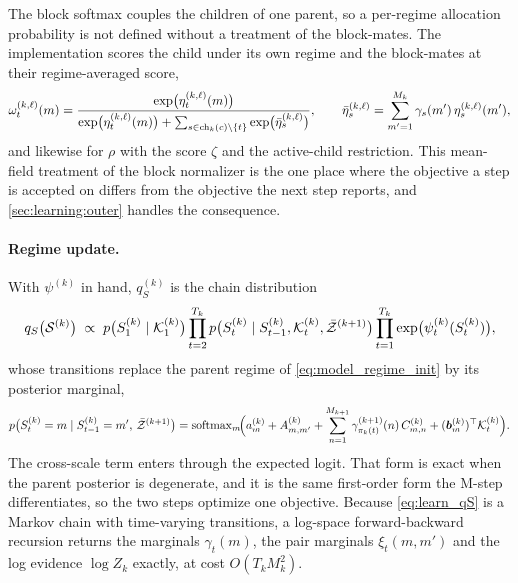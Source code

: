 The block softmax couples the children of one parent, so a per-regime allocation probability is
not defined without a treatment of the block-mates. The implementation scores the child under its
own regime and the block-mates at their regime-averaged score,
\begin{align}
\omega_t^{(k,\ell)}(m)
=
\frac{\exp\!\big(\eta_t^{(k,\ell)}(m)\big)}
{\exp\!\big(\eta_t^{(k,\ell)}(m)\big) + \sum_{s \in \operatorname{ch}_k(c) \setminus \{t\}} \exp\!\big(\bar{\eta}_s^{(k,\ell)}\big)},
\qquad
\bar{\eta}_s^{(k,\ell)} = \sum_{m'=1}^{M_k} \gamma_s(m')\, \eta_s^{(k,\ell)}(m'),
\label{eq:learn_loo_omega}
\end{align}
and likewise for $\rho$ with the score $\zeta$ and the active-child restriction. This mean-field
treatment of the block normalizer is the one place where the objective a step is accepted on
differs from the objective the next step reports, and \cref{sec:learning:outer} handles the
consequence.

\paragraph{Regime update.}
With $\psi^{(k)}$ in hand, $q_S^{(k)}$ is the chain distribution
\begin{align}
q_S\big({\mathcal{S}}^{(k)}\big)
\;\propto\;
p\big(S_1^{(k)} \mid {\mathcal{K}}_1^{(k)}\big)
\prod_{t=2}^{T_k}
p\big(S_t^{(k)} \mid S_{t-1}^{(k)}, {\mathcal{K}}_t^{(k)}, \bar{{\mathcal{Z}}}^{(k+1)}\big)
\prod_{t=1}^{T_k}
\exp\!\big(\psi_t^{(k)}(S_t^{(k)})\big),
\label{eq:learn_qS}
\end{align}
whose transitions replace the parent regime of \cref{eq:model_regime_init} by its posterior
marginal,
\begin{align}
p\big(S_t^{(k)} = m \mid S_{t-1}^{(k)} = m',\, \bar{{\mathcal{Z}}}^{(k+1)}\big)
=
\mathrm{softmax}_m\!\Big(
a_m^{(k)} + A_{m,m'}^{(k)}
+ \sum_{n=1}^{M_{k+1}} \gamma^{(k+1)}_{\pi_k(t)}(n)\, C_{m,n}^{(k)}
+ ({\bm{b}}_m^{(k)})^\top {\mathcal{K}}_t^{(k)}
\Big).
\label{eq:learn_trans_logit}
\end{align}
The cross-scale term enters through the expected logit. That form is exact when the parent
posterior is degenerate, and it is the same first-order form the M-step differentiates, so the
two steps optimize one objective. Because \cref{eq:learn_qS} is a Markov chain with time-varying
transitions, a log-space forward-backward recursion returns the marginals $\gamma_t(m)$, the pair
marginals $\xi_t(m,m')$ and the log evidence $\log Z_k$ exactly, at cost $O(T_k M_k^2)$.


